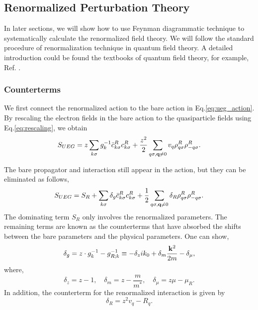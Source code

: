 \documentclass[reprint,amsmath,amssymb,aps,prb]{revtex4-1}
\begin{document}
\subsection{Renormalized Perturbation Theory}

In later sections, we will show how to use Feynman diagrammatic technique to systematically calculate the renormalized field theory. We will follow the standard procedure of renormalization technique in quantum field theory. A detailed introduction could be found the textbooks of quantum field theory, for example, Ref. .


\subsubsection{Counterterms}

We first connect the renormalized action to the bare action in Eq.\eqref{eq:ueg_action}. By rescaling the electron fields in the bare action to the quasiparticle fields using Eq.\eqref{eq:rescaling}, we obtain
\begin{equation}
    S_{UEG} = z\sum_{k \sigma} g_{k}^{-1}\bar{c}^R_{k \sigma} c^R_{k \sigma} + \frac{z^2}{2}\sum_{q\sigma, \mathbf{q} \neq 0}  v_q \rho^R_{q\sigma} \rho^R_{-q\sigma}.
\end{equation}

The bare propagator and interaction still appear in the action, but they can be eliminated as follows,
\begin{equation}
    \label{eq:renorm_action}
    S_{UEG} = S_R + \sum_{k \sigma} \delta_g \bar{c}^R_{k \sigma} c^R_{k \sigma} + \frac{1}{2}\sum_{q\sigma, \mathbf{q} \neq 0}  \delta_R \rho^R_{q\sigma} \rho^R_{-q\sigma}.
\end{equation}
The dominating term $S_R$ only involves the renormalized parameters. The remaining terms are known as the counterterms that have absorbed the shifts between the bare parameters and the physical parameters. One can show,
\begin{equation}
    \label{eq:ct1}
    \delta_g=z\cdot g_k^{-1}-g_{R; k}^{-1} \equiv -\delta_z ik_0+\delta_m \frac{\mathbf{k}^2}{2m} -\delta_\mu,
\end{equation}
where,
\begin{equation}
    \label{eq:ct2}
    \delta_z=z-1, \quad \delta_m=z-\frac{m}{m^*},\quad  \delta_\mu=z\mu-\mu_R.
\end{equation}
In addition, the counterterm for the renormalized interaction is given by
\begin{equation}
    \label{eq:ct3}
    \delta_R = z^2 v_q - R_q.
\end{equation}
\end{document}
